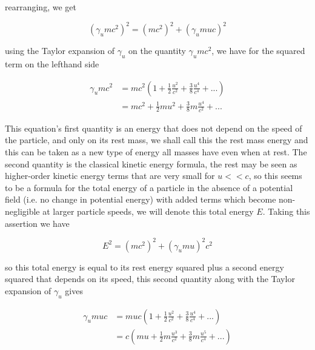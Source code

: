 rearranging, we get

\begin{equation}
	\label{eq: total relativistic energy}
	\left( \gamma_{u} m c^2 \right)^2 = (mc^2)^2 + \left( \gamma_{u} m u c \right)^2
\end{equation}

using the Taylor expansion of $\gamma_{u}$ on the quantity $\gamma_{u} mc^2$, we have for the squared term on the lefthand side

\begin{equation}
	\begin{aligned}
		\gamma_{u} mc^2 & = mc^2  \left(1 + \frac{1}{2}\frac{u^2}{c^2} + \frac{3}{8}\frac{u^4}{c^4} + ... \right) \\
		                & = mc^2   + \frac{1}{2}mu^2 + \frac{3}{8}m\frac{u^4}{c^2} + ...
	\end{aligned}
\end{equation}

This equation's first quantity is an energy that does not depend on the speed of the particle, and only on its rest mass, we shall call this the rest mass energy and this can be taken as a new type of energy all masses have even when at rest. The second quantity is the classical kinetic energy formula, the rest may be seen as higher-order kinetic energy terms that are very small for $u<<c$, so this seems to be a formula for the total energy of a particle in the absence of a potential field (i.e. no change in potential energy) with added terms which become non-negligible at larger particle speeds, we will denote this total energy $E$. Taking this assertion we have

\begin{equation}
	E^2 = \left( mc^2 \right)^2 + (\gamma_{u}mu)^2c^2
\end{equation}

so this total energy is equal to its rest energy squared plus a second energy squared that depends on its speed, this second quantity along with the Taylor expansion of $\gamma_{u}$ gives

\begin{equation}
	\begin{aligned}
		\gamma_{u} muc & = muc  \left(1 + \frac{1}{2}\frac{u^2}{c^2} + \frac{3}{8}\frac{u^4}{c^4} + ... \right)     \\
		               & = c \left( mu   + \frac{1}{2}m \frac{u^3}{c^2} + \frac{3}{8}m\frac{u^5}{c^4} + ... \right)
	\end{aligned}
\end{equation}

